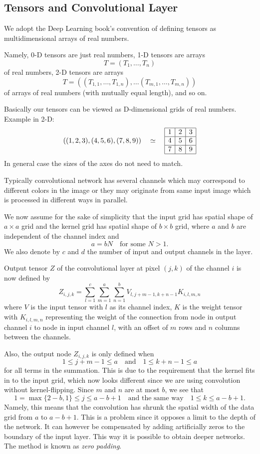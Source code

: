 \documentclass[]{article}
\begin{document}
\subsection{Tensors and Convolutional Layer}
We adopt the Deep Learning book's convention of defining tensors as
multidimensional arrays of real numbers.

Namely, 0-D tensors are just real numbers, 1-D tensors are arrays
\[
T = (T_1, \ldots, T_n)
\]
of real numbers, 2-D tensors are arrays
\[
T = ((T_{1,1}, \ldots, T_{1,n}), \ldots (T_{m,1}, \ldots, T_{m,n}))
\]
of arrays of real numbers (with mutually equal length), and so on.

Basically our tensors can be viewed as D-dimensional grids of real numbers.
Example in 2-D:
\[
((1, 2, 3), (4, 5, 6), (7, 8, 9)) \quad \simeq \quad
\begin{array}{|c|c|c|}
  \hline
  1 & 2 & 3 \\
  \hline
  4 & 5 & 6 \\
  \hline
  7 & 8 & 9 \\
  \hline
\end{array}
\]
In general case the sizes of the axes do not need to match.

Typically convolutional network has several channels which may correspond to different
colors in the image or they may originate from same input image which is processed
in different ways in parallel.

We now assume for the sake of simplicity that the input grid has spatial shape of
$a \times a$ grid and the kernel grid has spatial shape of $b \times b$ grid, where
$a$ and $b$ are independent of the channel index and
\[
a = b N \quad \text{for some $N > 1$}.
\]
We also denote by $c$ and $d$ the number of input and output channels in the layer.

Output tensor $Z$ of the convolutional layer at pixel $(j, k)$ of the channel $i$
is now defined by
\[
Z_{i, j, k} = \sum_{l=1}^c \sum_{m = 1}^a \sum_{n=1}^b
V_{l, j + m -1, k + n -1} K_{i, l, m, n}
\]
where $V$ is the input tensor with $l$ as its channel index, $K$ is the weight tensor with
$K_{i, l, m, n}$ representing the weight of the connection from node in output
channel $i$ to node in input channel $l$, with an offset of $m$ rows and $n$ columns
between the channels.

Also, the output node $Z_{i, j, k}$ is only defined when
\[
1 \le j + m - 1 \le a \quad \text{and} \quad 1 \le k + n - 1 \le a
\]
for all terms in the summation. This is due to the requirement that the kernel fits
in to the input grid, which now looks different since we are using convolution
without kernel-flipping. Since $m$ and $n$ are at most $b$, we see that
\[
1 = \max\{2 - b, 1\} \le j \le a - b + 1\quad \text{and the same way} \quad 1 \le k \le a - b + 1.
\]
Namely, this means that the convolution has shrunk the spatial width of the data grid
from $a$ to $a - b + 1$. This is a problem since it opposes a limit to the depth of
the network. It can however be compensated by adding artificially zeros to the
boundary of the input layer. This way it is possible to obtain deeper networks. The
method is known as \emph{zero padding}.
\end{document}
